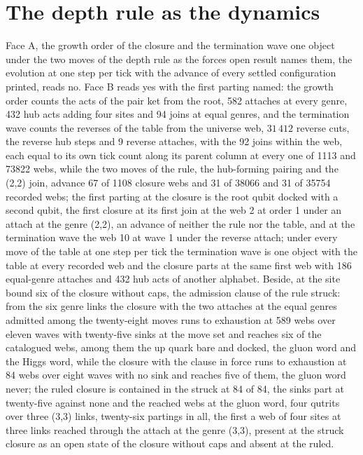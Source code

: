 \section{The depth rule as the dynamics}\label{mod:X-4-D543100-w-prdd}
\begin{chwall}\label{box:X-4-D543100-w-prdd:1}
Face A, the growth order of the closure and the termination wave one object under the two moves of the depth rule as the forces open result names them, the evolution at one step per tick with the advance of every settled configuration printed, reads no. Face B reads yes with the first parting named: the growth order counts the acts of the pair ket from the root, 582 attaches at every genre, 432 hub acts adding four sites and 94 joins at equal genres, and the termination wave counts the reverses of the table from the universe web, $31\,412$ reverse cuts, the reverse hub steps and 9 reverse attaches, with the 92 joins within the web, each equal to its own tick count along its parent column at every one of 1113 and 73822 webs, while the two moves of the rule, the hub-forming pairing and the (2,2) join, advance 67 of 1108 closure webs and 31 of 38066 and 31 of 35754 recorded webs; the first parting at the closure is the root qubit docked with a second qubit, the first closure at its first join at the web 2 at order 1 under an attach at the genre (2,2), an advance of neither the rule nor the table, and at the termination wave the web 10 at wave 1 under the reverse attach; under every move of the table at one step per tick the termination wave is one object with the table at every recorded web and the closure parts at the same first web with 186 equal-genre attaches and 432 hub acts of another alphabet. Beside, at the site bound six of the closure without caps, the admission clause of the rule struck: from the six genre links the closure with the two attaches at the equal genres admitted among the twenty-eight moves runs to exhaustion at 589 webs over eleven waves with twenty-five sinks at the move set and reaches six of the catalogued webs, among them the up quark bare and docked, the gluon word and the Higgs word, while the closure with the clause in force runs to exhaustion at 84 webs over eight waves with no sink and reaches five of them, the gluon word never; the ruled closure is contained in the struck at 84 of 84, the sinks part at twenty-five against none and the reached webs at the gluon word, four qutrits over three (3,3) links, twenty-six partings in all, the first a web of four sites at three links reached through the attach at the genre (3,3), present at the struck closure as an open state of the closure without caps and absent at the ruled.
\end{chwall}
